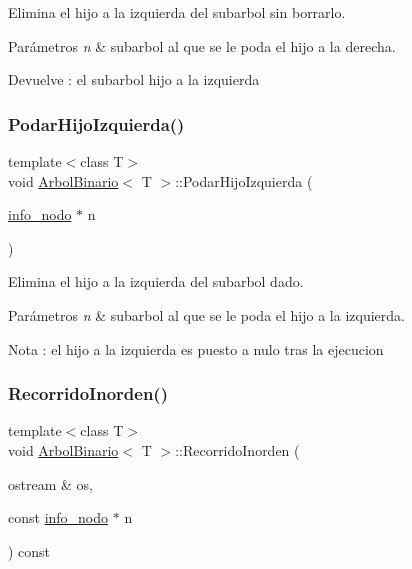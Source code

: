 Elimina el hijo a la izquierda del subarbol sin borrarlo. 


\begin{DoxyParams}{Parámetros}
{\em n} & subarbol al que se le poda el hijo a la derecha. \\
\hline
\end{DoxyParams}
\begin{DoxyReturn}{Devuelve}
\+: el subarbol hijo a la izquierda 
\end{DoxyReturn}
\mbox{\label{classArbolBinario_a289083bf048ca95e482264ccf0ce4f42}} 
\subsubsection{\texorpdfstring{Podar\+Hijo\+Izquierda()}{PodarHijoIzquierda()}}
{\footnotesize\ttfamily template$<$class T$>$ \\
void \hyperlink{classArbolBinario}{Arbol\+Binario}$<$ T $>$\+::Podar\+Hijo\+Izquierda (\begin{DoxyParamCaption}\item[{\hyperlink{structArbolBinario_1_1info__nodo}{info\+\_\+nodo} $\ast$}]{n }\end{DoxyParamCaption})\hspace{0.3cm}{\ttfamily [private]}}



Elimina el hijo a la izquierda del subarbol dado. 


\begin{DoxyParams}{Parámetros}
{\em n} & subarbol al que se le poda el hijo a la izquierda. \\
\hline
\end{DoxyParams}
\begin{DoxyNote}{Nota}
\+: el hijo a la izquierda es puesto a nulo tras la ejecucion 
\end{DoxyNote}
\mbox{\label{classArbolBinario_a072dec8f8e0f43d3e4ec295702a287ec}} 
\subsubsection{\texorpdfstring{Recorrido\+Inorden()}{RecorridoInorden()}}
{\footnotesize\ttfamily template$<$class T$>$ \\
void \hyperlink{classArbolBinario}{Arbol\+Binario}$<$ T $>$\+::Recorrido\+Inorden (\begin{DoxyParamCaption}\item[{ostream \&}]{os,  }\item[{const \hyperlink{structArbolBinario_1_1info__nodo}{info\+\_\+nodo} $\ast$}]{n }\end{DoxyParamCaption}) const\hspace{0.3cm}{\ttfamily [private]}}



